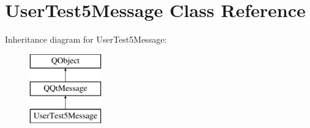 \hypertarget{class_user_test5_message}{}\section{User\+Test5\+Message Class Reference}
\label{class_user_test5_message}
Inheritance diagram for User\+Test5\+Message\+:\begin{figure}[H]
\begin{center}
\leavevmode
\includegraphics[height=3.000000cm]{class_user_test5_message}
\end{center}
\end{figure}
